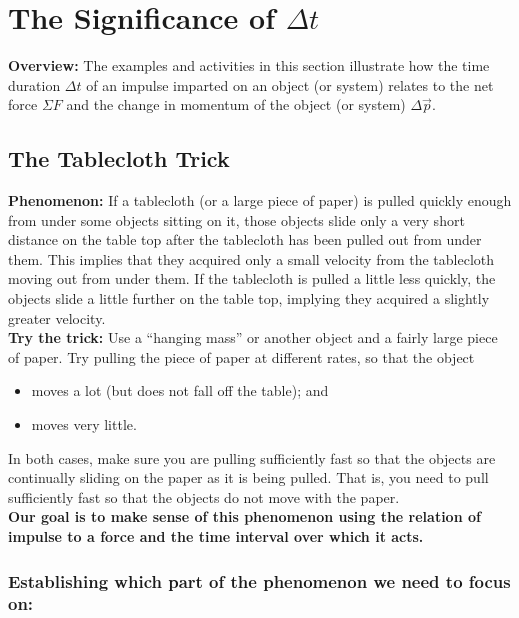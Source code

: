 \section[The Significance of $\Delta t$]{\protect\boldmath The Significance of $\Delta t$}

\begin{overview}
\textbf{Overview:} The examples and activities in this section illustrate how the time duration $\Delta t$ of an impulse imparted on an object (or system) relates to the net force $\Sigma F$ and the change in momentum of the object (or system) $\Delta \vec{p}$.
\end{overview}

\subsection{The Tablecloth Trick}
\label{act7.1.3B}

\textbf{Phenomenon:} If a tablecloth (or a large piece of paper) is pulled quickly enough from under some objects sitting on it, those objects slide only a very short distance on the table top after the tablecloth has been pulled out from under them. This implies that they acquired only a small velocity from the tablecloth moving out from under them. If the tablecloth is pulled a little less quickly, the objects slide a little further on the table top, implying they acquired a slightly greater velocity.\\

\noindent\textbf{Try the trick:} Use a ``hanging mass'' or another object and a fairly large piece of paper. Try pulling the piece of paper at different rates, so that the object
	\begin{itemize}
		\item moves a lot (but does not fall off the table); and
		\item moves very little.
	\end{itemize}

\noindent In both cases, make sure you are pulling sufficiently fast so that the objects are continually sliding on the paper as it is being pulled. That is, you need to pull sufficiently fast so that the objects do not move with the paper.\\
	
\noindent\textbf{Our goal is to make sense of this phenomenon using the relation of impulse to a force and the time interval over which it acts.}

\subsubsection*{Establishing which part of the phenomenon we need to focus on:}

